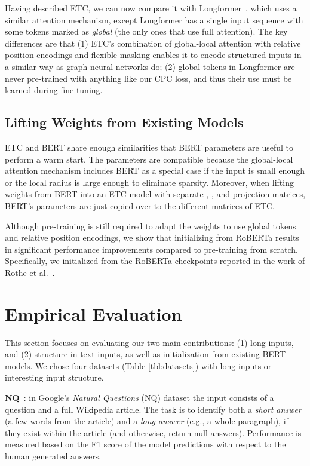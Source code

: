 \documentclass[11pt,a4paper]{article}
\begin{document}
Having described ETC, we can now compare it with Longformer~\cite{beltagy2020longformer}, which uses a similar attention mechanism, except Longformer has a single input sequence with some tokens marked as {\em global} (the only ones that use full attention). The key differences are that (1) ETC's combination of global-local attention with relative position encodings and flexible masking enables it to encode structured inputs in a similar way as graph neural networks do; (2) global tokens in Longformer are never pre-trained with anything like our CPC loss, and thus their use must be learned during fine-tuning. 



\subsection{Lifting Weights from Existing Models}

ETC and BERT share enough similarities that BERT parameters are useful to perform a warm start. The parameters are compatible because the global-local attention mechanism includes BERT as a special case if the input is small enough or the local radius is large enough to eliminate sparsity.
Moreover, when lifting weights from BERT into an ETC model with separate , , and  projection matrices, BERT's parameters are just copied over to the different matrices of ETC. 

Although pre-training is still required to adapt the weights to use global tokens and relative position encodings, we show that initializing from RoBERTa results in significant performance improvements compared to pre-training from scratch. Specifically, we initialized from the RoBERTa checkpoints reported in the work of Rothe et al.~\cite{rothe2020leveraging}.







\section{Empirical Evaluation}\label{sec:experiments}



This section focuses on evaluating our two main contributions: (1) long inputs, and (2) structure in text inputs, as well as initialization from existing BERT models. 
We chose four datasets (Table \ref{tbl:datasets}) with long inputs or interesting input structure.

{\bf NQ}~\cite{kwiatkowski2019natural}: in Google's {\em Natural Questions} (NQ) dataset the input consists of a question and a full Wikipedia article. The task is to identify both a {\em short answer} (a few words from the article) and a {\em long answer} (e.g., a whole paragraph), if they exist within the article (and otherwise, return null answers). Performance is measured based on the F1 score of the model predictions with respect to the human generated answers. 
\end{document}
